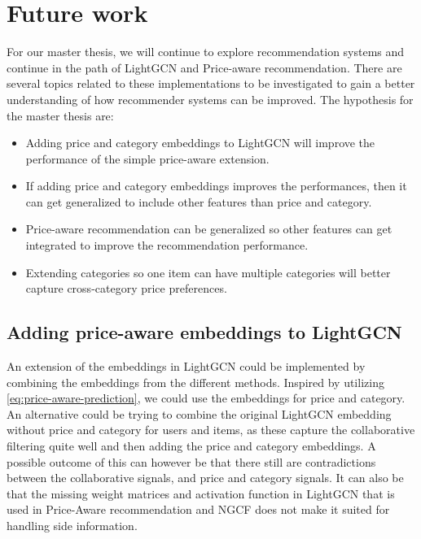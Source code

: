 \section{Future work}
For our master thesis, we will continue to explore recommendation systems and continue in the path of LightGCN and Price-aware recommendation.
There are several topics related to these implementations to be investigated to gain a better understanding of how recommender systems can be improved.
The hypothesis for the master thesis are:
\begin{itemize}
    \item Adding price and category embeddings to LightGCN will improve the performance of the simple price-aware extension.
    \item If adding price and category embeddings improves the performances, then it can get generalized to include other features than price and category.
    \item Price-aware recommendation can be generalized so other features can get integrated to improve the recommendation performance.
    \item Extending categories so one item can have multiple categories will better capture cross-category price preferences.
\end{itemize}

\subsection{Adding price-aware embeddings to LightGCN}
An extension of the embeddings in LightGCN could be implemented by combining the embeddings from the different methods.
Inspired by utilizing \autoref{eq:price-aware-prediction}, we could use the embeddings for price and category.
An alternative could be trying to combine the original LightGCN embedding without price and category for users and items, as these capture the collaborative filtering quite well and then adding the price and category embeddings.
A possible outcome of this can however be that there still are contradictions between the collaborative signals, and price and category signals.
It can also be that the missing weight matrices and activation function in LightGCN that is used in Price-Aware recommendation and NGCF does not make it suited for handling side information.

